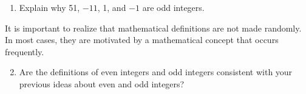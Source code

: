 \begin{previewactivity}
\begin{enumerate}
\begin{enumerate}
\item Explain why 51, $-11$, 1, and $-1$  are odd integers.
\end{enumerate}
\end{enumerate}

\noindent
It is important to realize that mathematical definitions are not made randomly.  In most cases, they are motivated by a mathematical concept that occurs frequently.
%
\begin{enumerate}
\setcounter{enumi}{1}
\item Are the definitions of even integers and odd integers consistent with your previous ideas about even and odd integers?	
\end{enumerate}
\hbreak
\end{previewactivity}

\endinput
